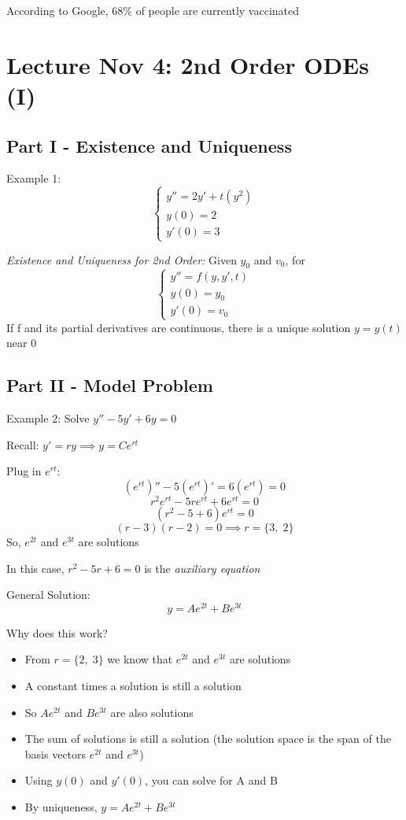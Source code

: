 \documentclass[12pt]{article}
\begin{document}
According to Google, 68\% of people are currently vaccinated

\section{Lecture Nov 4: 2nd Order ODEs (I)}
\subsection*{Part I - Existence and Uniqueness}
Example 1:
\[\begin{cases}
    y'' = 2y' + t(y^2)\\
    y(0) = 2\\
    y'(0) = 3
\end{cases}\]

\emph{Existence and Uniqueness for 2nd Order:} Given $y_0$ and $v_0$, for 
\[\begin{cases}
    y'' = f(y, y', t)\\
    y(0) = y_0\\
    y'(0) = v_0
\end{cases}\]
If f and its partial derivatives are continuous, there is a unique solution $y = y(t)$ near 0

\subsection*{Part II - Model Problem}
Example 2: 
Solve $y'' - 5y' + 6y = 0$

Recall: $y' = ry \implies y = Ce^{rt}$

Plug in $e^{rt}$:
\[(e^{rt})'' - 5(e^{rt})' = 6(e^{rt}) = 0\]
\[r^2e^{rt} - 5re^{rt} + 6e^{rt} = 0\]
\[(r^2 - 5 + 6) e^{rt} = 0\]
\[(r - 3)(r - 2) = 0 \implies r = \{3, \; 2\}\]
So, $e^{2t}$ and $e^{3t}$ are solutions

In this case, $r^2 - 5r + 6 = 0$ is the \emph{auxiliary equation}

General Solution:
\[y = Ae^{2t} + Be^{3t}\]

Why does this work?
\begin{itemize}
    \item From $r = \{2, \; 3\}$ we know that $e^{2t}$ and $e^{3t}$ are solutions
    \item A constant times a solution is still a solution
    \item So $Ae^{2t}$ and $Be^{3t}$ are also solutions 
    \item The sum of solutions is still a solution (the solution space is the span of the basis vectors $e^{2t}$ and $e^{3t}$)
    \item Using $y(0)$ and $y'(0)$, you can solve for A and B
    \item By uniqueness, $y = Ae^{2t} + Be^{3t}$
\end{itemize}
\end{document}
